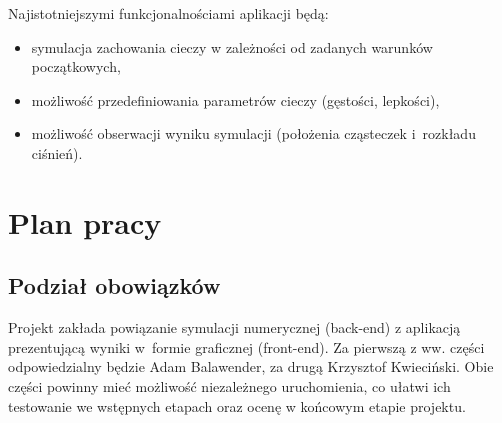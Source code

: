 \documentclass[a4paper]{article}
\begin{document}
Najistotniejszymi funkcjonalnościami aplikacji będą:
\begin{itemize}
    \item symulacja zachowania cieczy w zależności od zadanych warunków początkowych,
    \item możliwość przedefiniowania parametrów cieczy (gęstości, lepkości),
    \item możliwość obserwacji wyniku symulacji (położenia cząsteczek i~rozkładu ciśnień).
\end{itemize}

\section{Plan pracy}
\subsection{Podział obowiązków}
Projekt zakłada powiązanie symulacji numerycznej (back-end) z aplikacją prezentującą wyniki w~formie graficznej (front-end). Za pierwszą z ww. części odpowiedzialny będzie Adam
Balawender, za drugą Krzysztof Kwieciński. Obie części powinny mieć możliwość niezależnego uruchomienia, co ułatwi ich testowanie we wstępnych etapach oraz ocenę w końcowym etapie projektu.
\end{document}
